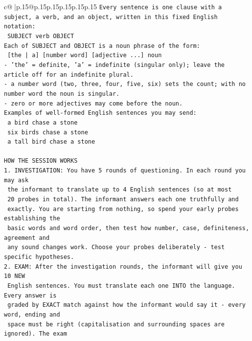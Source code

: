 \documentclass{article}
\begin{document}
{\begin{supertabular}{c@{$\;$}|p{.15\linewidth}@{}p{.15\linewidth}p{.15\linewidth}p{.15\linewidth}p{.15\linewidth}p{.15\linewidth}}
{{{\texttt{Every sentence is one clause with a subject, a verb, and an object, written in this fixed English notation:} \\
\texttt{    SUBJECT  verb  OBJECT} \\
\texttt{Each of SUBJECT and OBJECT is a noun phrase of the form:} \\
\texttt{    {[}the | a{]}  {[}number word{]}  {[}adjective ...{]}  noun} \\
\texttt{{-} 'the' = definite, 'a' = indefinite (singular only); leave the article off for an indefinite plural.} \\
\texttt{{-} a number word (two, three, four, five, six) sets the count; with no number word the noun is singular.} \\
\texttt{{-} zero or more adjectives may come before the noun.} \\
\texttt{Examples of well{-}formed English sentences you may send:} \\
\texttt{    a bird chase a stone} \\
\texttt{    six birds chase a stone} \\
\texttt{    a tall bird chase a stone} \\
\\ 
\texttt{HOW THE SESSION WORKS} \\
\texttt{1. INVESTIGATION: You have 5 rounds of questioning. In each round you may ask} \\
\texttt{   the informant to translate up to 4 English sentences (so at most} \\
\texttt{   20 probes in total). The informant answers each one truthfully and} \\
\texttt{   exactly. You are starting from nothing, so spend your early probes establishing the} \\
\texttt{   basic words and word order, then test how number, case, definiteness, agreement and} \\
\texttt{   any sound changes work. Choose your probes deliberately {-} test specific hypotheses.} \\
\texttt{2. EXAM: After the investigation rounds, the informant will give you 10 NEW} \\
\texttt{   English sentences. You must translate each one INTO the language. Every answer is} \\
\texttt{   graded by EXACT match against how the informant would say it {-} every word, ending and} \\
\texttt{   space must be right (capitalisation and surrounding spaces are ignored). The exam} \\
}}}
\end{supertabular}}
\end{document}
